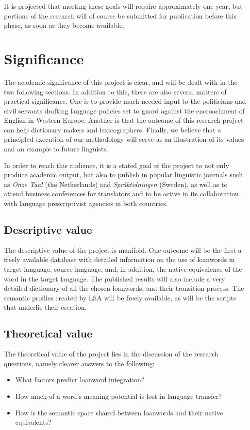 \documentclass[a4paper]{article}
\begin{document}
It is projected that meeting these goals will require approximately one year, but portions of the research will of course be submitted for publication before this phase, as soon as they become available.



\section{Significance}
The academic significance of this project is clear, and will be dealt with in the two following sections. In addition to this, there are also several matters of  practical significance. One is to provide much needed input to the politicians and civil servants drafting language policies set to guard against the encroachment of English in Western Europe. Another is that the outcome of this research project can help dictionary makers and lexicographers. Finally, we believe that a principled execution of our methodology will serve as an illustration of its values and an example to future linguists.

In order to reach this audience, it is a stated goal of the project to not only produce academic output, but also to publish in popular linguistic journals such as \emph{Onze Taal} (the Netherlands) and \emph{Spr\aa ktidningen} (Sweden), as well as to attend business conferences for translators and to be active in its collaboration with language prescriptivist agencies in both countries. 

\subsection{Descriptive value}
The descriptive value of the project is manifold. One outcome will be the first a freely available database with detailed information on the use of loanwords in target language, source language, and, in addition, the native equivalence of the word in the target language. The published results will also include a very detailed dictionary of all the chosen loanwords, and their transition process. The semantic profiles created by LSA will be freely available, as will be the scripts that underlie their creation. 



\subsection{Theoretical value}
The theoretical value of the project lies in the discussion of the research questions, namely clearer answers to the following:
\begin{itemize}
	\item What factors predict loanword integration?
	\item How much of a word's meaning potential is lost in language transfer?
	\item How is the semantic space shared between loanwords and their native equivalents?	
\end{itemize}
\end{document}
